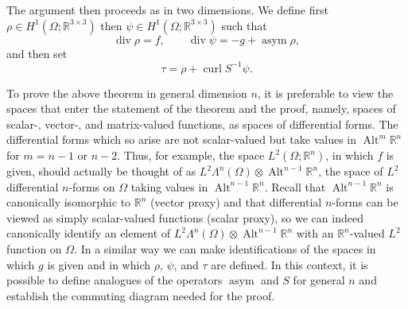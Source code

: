 \begin{Proof}
{The argument then proceeds as in two dimensions. We define first $\rho\in H^1(\Omega;\mathbb R^{3\times3})$ then $\psi\in H^1(\Omega;\mathbb R^{3\times3})$ such that}
\[
\operatorname{div}\rho=f,\qquad\operatorname{div}\psi=-g+\operatorname{asym}\rho,
\]
{and then set}
\[
\tau=\rho+\operatorname{curl}S^{-1}\psi.
\]
\end{Proof}

\begin{Remark}\label{rem:elasticity-general-dimension}
{To prove the above theorem in general dimension $n$, it is preferable to view the spaces that enter the statement of the theorem and the proof, namely, spaces of scalar-, vector-, and matrix-valued functions, as spaces of differential forms. The differential forms which so arise are not scalar-valued but take values in $\operatorname{Alt}^m\mathbb R^n$ for $m=n-1$ or $n-2$. Thus, for example, the space $L^2(\Omega;\mathbb R^n)$, in which $f$ is given, should actually be thought of as $L^2\Lambda^n(\Omega)\otimes\operatorname{Alt}^{n-1}\mathbb R^n$, the space of $L^2$ differential $n$-forms on $\Omega$ taking values in $\operatorname{Alt}^{n-1}\mathbb R^n$. Recall that $\operatorname{Alt}^{n-1}\mathbb R^n$ is canonically isomorphic to $\mathbb R^n$ (vector proxy) and that differential $n$-forms can be viewed as simply scalar-valued functions (scalar proxy), so we can indeed canonically identify an element of $L^2\Lambda^n(\Omega)\otimes\operatorname{Alt}^{n-1}\mathbb R^n$ with an $\mathbb R^n$-valued $L^2$ function on $\Omega$. In a similar way we can make identifications of the spaces in which $g$ is given and in which $\rho$, $\psi$, and $\tau$ are defined. In this context, it is possible to define analogues of the operators $\operatorname{asym}$ and $S$ for general $n$ and establish the commuting diagram needed for the proof.}
\end{Remark}

